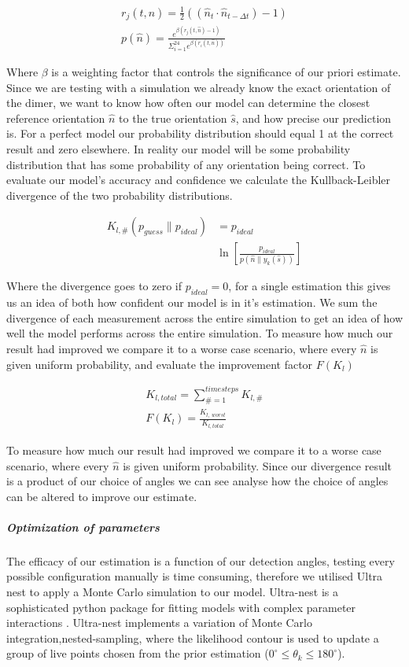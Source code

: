 \documentclass[final,3p, twocolumn]{elsarticle}
\begin{document}
\begin{align}
	r_j(t, \hat{n})= \frac{1}{2}((\hat{n}_{t} \cdot \hat{n}_{t-\Delta t})-1) \\
	p(\hat{n})= \frac{e^{\beta (r_j(t,\hat{n})-1)}}
	{\Sigma_{i=1}^{24}e^{\beta(r_i(t, \hat{n}))}}
\end{align}

Where $\beta$ is a weighting factor that controls the significance of our priori estimate. Since we are testing with a simulation we already know the exact orientation of the dimer, we want to know how often our model can determine the closest reference orientation $\hat{n}$ to the true orientation $\hat{s}$, and how precise our prediction is. For a perfect model our probability distribution should equal 1 at the correct result and zero elsewhere. In reality our model will be some probability distribution that has some probability of any orientation being correct. To evaluate our model's accuracy and confidence we calculate the Kullback-Leibler divergence of the two probability distributions. 

\begin{align}
	K_{l, \#}(p_{guess} \parallel p_{ideal}) &= 
	p_{ideal} \nonumber \\ 
	&\ln \left[\frac{p_{ideal}}{p(\hat{n}\parallel y_k(\hat{s}))}
	\right]
\end{align}

Where the divergence goes to zero if $p_{ideal}=0$, for a single estimation this gives us an idea of both how confident our model is in it's estimation. We sum the divergence of each measurement across the entire simulation to get an idea of how well the model performs across the entire simulation. To measure how much our result had improved we compare it to a worse case scenario, where every $\hat{n}$ is given uniform probability, and evaluate the improvement factor $F(K_l)$

\begin{align}
	K_{l,total} = \sum\limits_{\# =1}^{timesteps} K_{l,\#} \\
	F(K_l) = \frac{K_{l,\ worst}}{K_{l,total}}
\end{align}

To measure how much our result had improved we compare it to a worse case scenario, where every $\hat{n}$ is given uniform probability. Since our divergence result is a product of our choice of angles we can see analyse how the choice of angles can be altered to improve our estimate.  

\subparagraph{Optimization of parameters}
\label{2.2}
The efficacy of our estimation is a function of our detection angles, testing every possible configuration manually is time consuming, therefore we utilised Ultra nest to apply a Monte Carlo simulation to our model. Ultra-nest is a sophisticated python package for fitting models with complex parameter interactions \cite{Ultranest}. Ultra-nest implements a variation of Monte Carlo integration,nested-sampling, where the likelihood contour is used to update a group of live points chosen from the prior estimation ($0^{\circ} \leq \theta_k \leq 180^{\circ}$).
\end{document}
